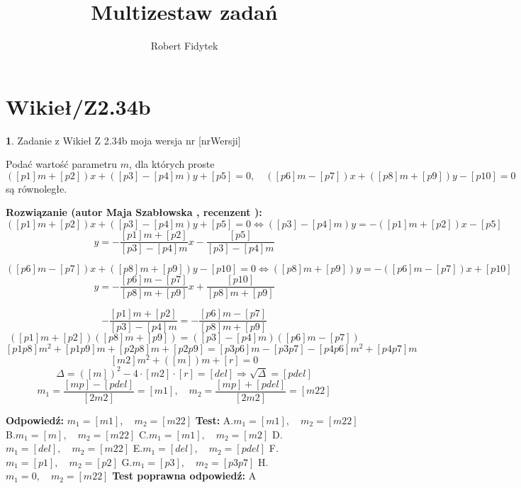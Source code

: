 \documentclass[12pt, a4paper]{article}
\title{Multizestaw zadań}
\author{Robert Fidytek}
\date{}
\theoremstyle{definition} %
\newtheorem{zad}{}
\newcommand{\kategoria}[1]{\section{#1}} %
\newcommand{\zadStart}[1]{\begin{zad}#1\newline} %
\newcommand{\zadStop}{\end{zad}}   %
\newcommand{\rozwStart}[2]{\noindent \textbf{Rozwiązanie (autor #1 , recenzent #2): }\newline} %
\newcommand{\rozwStop}{\newline}                                            %
\newcommand{\odpStart}{\noindent \textbf{Odpowiedź:}\newline}    %
\newcommand{\odpStop}{\newline}                                             %
\newcommand{\testStart}{\noindent \textbf{Test:}\newline} %
\newcommand{\testStop}{\newline} %
\newcommand{\kluczStart}{\noindent \textbf{Test poprawna odpowiedź:}\newline} %
\newcommand{\kluczStop}{\newline} %
\begin{document}
\maketitle


\kategoria{Wikieł/Z2.34b}
\zadStart{Zadanie z Wikieł Z 2.34b  moja wersja nr [nrWersji]}

Podać wartość parametru $m$, dla których proste 
$$([p1]m+[p2])x+([p3]-[p4]m)y+[p5]=0, \quad ([p6]m-[p7])x+([p8]m+[p9])y-[p10]=0 $$są równoległe.
\zadStop

\rozwStart{Maja Szabłowska}{}
$$([p1]m+[p2])x+([p3]-[p4]m)y+[p5]=0 \iff ([p3]-[p4]m)y=-([p1]m+[p2])x-[p5]$$
$$y=-\frac{[p1]m+[p2]}{[p3]-[p4]m}x-\frac{[p5]}{[p3]-[p4]m}$$

$$([p6]m-[p7])x+([p8]m+[p9])y-[p10]=0 \iff ([p8]m+[p9])y=-([p6]m-[p7])x+[p10]$$
$$y=-\frac{[p6]m-[p7]}{[p8]m+[p9]}x+\frac{[p10]}{[p8]m+[p9]}$$

$$-\frac{[p1]m+[p2]}{[p3]-[p4]m}=-\frac{[p6]m-[p7]}{[p8]m+[p9]}$$
$$([p1]m+[p2])([p8]m+[p9])=([p3]-[p4]m)([p6]m-[p7])$$
$$[p1p8]m^{2}+[p1p9]m+[p2p8]m+[p2p9]=[p3p6]m-[p3p7]-[p4p6]m^{2}+[p4p7]m$$
$$[m2]m^{2}+([m])m+[r]=0$$
$$\Delta=([m])^{2}-4\cdot[m2]\cdot[r]=[del] \Rightarrow \sqrt{\Delta}=[pdel]$$
$$m_{1}=\frac{[mp]-[pdel]}{[2m2]}=[m1], \quad m_{2}=\frac{[mp]+[pdel]}{[2m2]}=[m22]$$
\rozwStop


\odpStart
$m_{1}=[m1], \quad m_{2}=[m22]$
\odpStop
\testStart
A.$m_{1}=[m1], \quad m_{2}=[m22]$
B.$m_{1}=[m], \quad m_{2}=[m22]$
C.$m_{1}=[m1], \quad m_{2}=[m2]$
D.$m_{1}=[del], \quad m_{2}=[m22]$
E.$m_{1}=[del], \quad m_{2}=[pdel]$
F.$m_{1}=[p1], \quad m_{2}=[p2]$
G.$m_{1}=[p3], \quad m_{2}=[p3p7]$
H.$m_{1}=0, \quad m_{2}=[m22]$
\testStop
\kluczStart
A
\kluczStop
\end{document}
